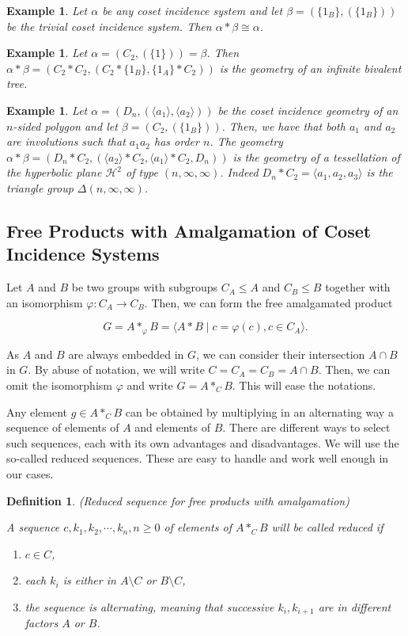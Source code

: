 \documentclass[11pt,letterpaper]{amsart}
\newtheorem{definition}[prop]{Definition}
\newtheorem{example}[prop]{Example}
\begin{document}
\begin{example}
    Let $\alpha$ be any coset incidence system and let $\beta = (\{1_B\},(\{1_B\}))$ be the trivial coset incidence system. Then $\alpha * \beta \cong \alpha$.
\end{example}
\begin{example}
    Let $\alpha = (C_2, (\{1\})) = \beta$. Then $\alpha * \beta = (C_2 * C_2, (C_2 * \{1_B\}, \{1_A\} * C_2))$ is the geometry of an infinite bivalent tree.
\end{example}
\begin{example}
    Let $\alpha = (D_n, (\langle a_1\rangle, \langle a_2 \rangle))$ be the coset incidence geometry of an $n$-sided polygon and let $\beta =  (C_2, (\{1_B\}))$. Then, we have that both $a_1$ and $a_2$ are involutions such that $a_1a_2$ has order $n$. The geometry $\alpha * \beta = (D_n *C_2, (\langle a_2 \rangle * C_2, \langle a_1 \rangle * C_2, D_n))$ is the geometry of a tessellation of the hyperbolic plane $\mathcal{H}^2$ of type $(n, \infty, \infty)$. Indeed $D_n * C_2 = \langle a_1,a_2,a_3 \rangle$ is the triangle group $\Delta(n,\infty,\infty)$.

\end{example}

\subsection{Free Products with Amalgamation of Coset Incidence Systems}

Let $A$ and $B$ be two groups with subgroups $C_A \leq A$ and $C_B \leq B$ together with an isomorphism $\varphi \colon C_A \to C_B$. Then, we can form the free amalgamated product

$$ 
G = A *_\varphi B = \langle A * B \mid c = \varphi(c), c \in C_A \rangle.
$$

As $A$ and $B$ are always embedded in $G$, we can consider their intersection $A \cap B$ in $G$. By abuse of notation, we will write $C = C_A = C_B = A \cap B$. Then, we can omit the isomorphism $\varphi$ and write $G = A *_C B$. This will ease the notations. 

Any element $g \in A *_C B$ can be obtained by multiplying in an alternating way a sequence of elements of $A$ and elements of $B$. There are different ways to select such sequences, each with its own advantages and disadvantages. We will use the so-called reduced sequences. These are easy to handle and work well enough in our cases.
\begin{definition}(Reduced sequence for free products with amalgamation)

A sequence $c,k_1,k_2, \cdots , k_n, n\geq 0$ of elements of $A*_CB$ will be called \textit{reduced} if 
\begin{enumerate}
    \item $c \in C$,
    \item each $k_i$ is either in $A \setminus C$ or $B \setminus C$,
    \item the sequence is alternating, meaning that successive $k_i, k_{i+1}$ are in different factors $A$ or $B$.
\end{enumerate}
\end{definition}
\end{document}
